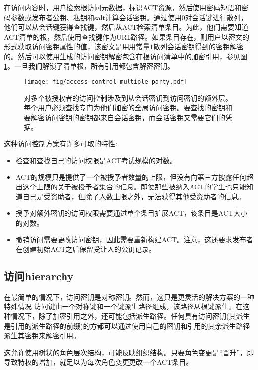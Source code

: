 在访问内容时，用户检索根访问元数据，标识ACT资源，然后使用密码短语和密码参数或发布者公钥、私钥和salt计算会话密钥。通过使用$0$对会话键进行散列，他们可以从会话键获得查找键，然后从ACT检索清单条目。为此，他们需要知道ACT清单的根，然后使用查找键作为URL路径。如果条目存在，则用户以密文的形式获取访问密钥属性的值，该密文是用用常量$1$散列会话密钥得到的密钥解密的。然后可以使用生成的访问密钥解密包含在根访问清单中的加密引用，参见图\ref{fig:access-control-multiple-party}。一旦我们解锁了清单根，所有引用都包含解密密钥。

\begin{figure}[htbp]
\centering
\texttt{[image: fig/access-control-multiple-party.pdf]}
\caption[对多个被授权的访问控制\statusyellow]{对多个被授权者的访问控制涉及到从会话密钥到访问密钥的额外层。每个用户必须查找专门为他们加密的全局访问密钥。要查找的密钥和要解密访问密钥的密钥都来自会话密钥，而会话密钥又需要它们的凭据。} 
\label{fig:access-control-multiple-party}
\end{figure}


这种访问控制方案有许多可取的特性:
\begin{itemize}
\item 检查和查找自己的访问权限是ACT考试规模的对数。
\item ACT的规模只是提供了一个被授予者数量的上限，但没有向第三方披露任何超出这个上限的关于被授予者集合的信息。即使那些被纳入ACT的学生也只能知道自己是受资助者，但除了人数上限之外，无法获得其他受资助者的信息。
\item 授予对额外密钥的访问权限需要通过单个条目扩展ACT，该条目是ACT大小的对数。 
\item 撤销访问需要更改访问密钥，因此需要重新构建ACT。注意，这还要求发布者在创建初始ACT之后保留受让人的公钥记录。
\end{itemize}

\subsection{访问hierarchy\statusgreen}

在最简单的情况下，访问密钥是对称密钥。然而，这只是更灵活的解决方案的一种特殊情况
访问键由一个对称键和一个键派生路径组成，该路径从根键派生。在这种情况下，除了加密引用之外，还可能包括派生路径。任何具有访问密钥(其派生是引用的派生路径的前缀)的方都可以通过使用自己的密钥和引用的其余派生路径派生其密钥来解密引用。

这允许使用树状的角色层次结构，可能反映组织结构。只要角色变更是“晋升”，即导致特权的增加，就足以为每次角色变更更改一个ACT条目。

